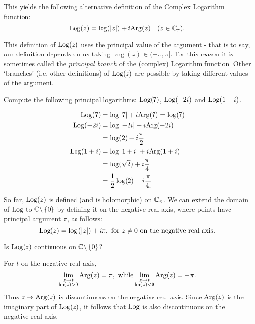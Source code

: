 This yields the following alternative definition of the Complex Logarithm function:
\begin{equation}
\operatorname{Log} (z) = \log ( \left| z \right| )+i \mathrm{Arg} (z) \quad (z \in \mathbb{C}_{\pi}).
\end{equation}
\begin{note}
This definition of $\operatorname{Log} (z)$ uses the principal value of the argument - that is to say, our definition depends on us taking $\arg (z) \in (-\pi, \pi]$.  For this reason it is sometimes called the \emph{principal branch} of the (complex) Logarithm function.  Other `branches' (i.e. other definitions) of $\operatorname{Log} (z)$ are possible by taking different values of the argument.
\end{note}
\begin{example}
Compute the following principal logarithms: $\operatorname{Log} (7)$, $\operatorname{Log} (-2i)$ and $\operatorname{Log} (1+i)$.
\end{example}
\begin{solution}
\begin{align*}
\operatorname{Log} (7) & = \log \left| 7 \right| + i \mathrm{Arg} (7) = \log(7) \\
\operatorname{Log} (-2i) & = \log \left| -2i \right| + i \mathrm{Arg} (-2i) \\
& = \log(2) -i \frac{\pi}{2} \\
\operatorname{Log} (1+i ) & = \log \left| 1+i \right| + i \mathrm{Arg} (1+i) \\
& = \log ( \sqrt{2} ) + i \frac{\pi}{4} \\
& = \frac{1}{2} \log (2) + i \frac{\pi}{4.}
\end{align*}
\end{solution}

So far, $\operatorname{Log} (z)$ is defined (and is holomorphic) on $\mathbb{C}_{\pi}$. We can extend the domain of $\operatorname{Log}$ to $\mathbb{C} \backslash\left\{0\right\}$ by defining it on the negative real axis, where points have principal argument $\pi$, as follows:
\[
\operatorname{Log} (z) = \log \left( \left| z \right| \right) + i \pi, \mbox{ for $z \neq 0$ on the negative real axis.}
\]
\begin{question}
Is $\operatorname{Log}(z)$ continuous on $\mathbb{C} \backslash \left\{0\right\}$?
\end{question}
\begin{answer}
For $t$ on the negative real axis,
\[
\displaystyle \lim_{\substack{z \to t \\  \textsf{Im} (z) > 0 }} \mathrm{Arg} (z) = \pi, \text{ while} \displaystyle \lim_{\substack{z \to t \\ \textsf{Im}(z)<0}} \mathrm{Arg} (z) = -\pi.
\]
Thus $z \mapsto \mathrm{Arg} (z)$ is discontinuous on the negative real axis.  Since $\mathrm{Arg} (z)$ is the imaginary part of $\operatorname{Log}(z)$, it follows that $\operatorname{Log}$ is also discontinuous on the negative real axis.
\end{answer}


